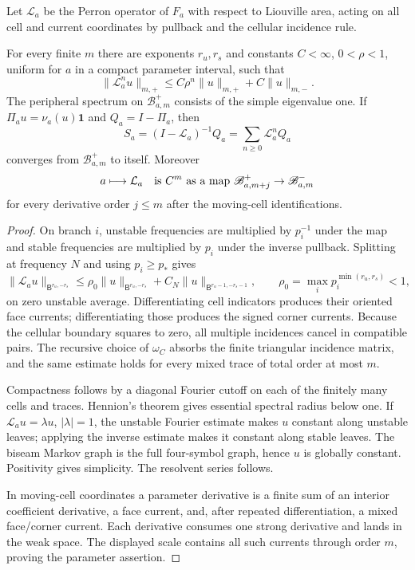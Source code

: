 Let $\mathcal L_a$ be the Perron operator of $F_a$ with respect to Liouville
area, acting on all cell and current coordinates by pullback and the cellular
incidence rule.

\begin{theorem}
\label{thm:r7-a1-anisotropic}
For every finite $m$ there are exponents $r_u,r_s$ and constants
$C<\infty$, $0<\rho<1$, uniform for $a$ in a compact parameter interval, such
that
\[
 \|\mathcal L_a^nu\|_{m,+}
 \le C\rho^n\|u\|_{m,+}+C\|u\|_{m,-}.
\]
The peripheral spectrum on $\mathscr B_{a,m}^+$ consists of the simple
eigenvalue one.  If $\Pi_a u=\nu_a(u)\mathbf1$ and $Q_a=I-\Pi_a$, then
\[
 S_a=(I-\mathcal L_a)^{-1}Q_a
 =\sum_{n\ge0}\mathcal L_a^nQ_a
\]
converges from $\mathscr B_{a,m}^+$ to itself.  Moreover
\[
 a\longmapsto\mathcal L_a
 \quad\hbox{is }C^m\hbox{ as a map }
 \mathscr B_{a,m+j}^+\to\mathscr B_{a,m}^-
\]
for every derivative order $j\le m$ after the moving-cell identifications.
\end{theorem}

\begin{proof}
On branch $i$, unstable frequencies are multiplied by $p_i^{-1}$ under the
map and stable frequencies are multiplied by $p_i$ under the inverse
pullback.  Splitting at frequency $N$ and using $p_i\ge p_*$ gives
\[
 \|\mathcal L_a u\|_{\mathsf B^{r_u,-r_s}}
 \le \rho_0\|u\|_{\mathsf B^{r_u,-r_s}}
 +C_N\|u\|_{\mathsf B^{r_u-1,-r_s-1}},
 \qquad
 \rho_0=\max_i p_i^{\min(r_u,r_s)}<1,
\]
on zero unstable average.  Differentiating cell indicators produces their
oriented face currents; differentiating those produces the signed corner
currents.  Because the cellular boundary squares to zero, all multiple
incidences cancel in compatible pairs.  The recursive choice of $\omega_C$
absorbs the finite triangular incidence matrix, and the same estimate holds
for every mixed trace of total order at most $m$.

Compactness follows by a diagonal Fourier cutoff on each of the finitely many
cells and traces.  Hennion's theorem gives essential spectral radius below
one.  If $\mathcal L_au=\lambda u$, $|\lambda|=1$, the unstable Fourier
estimate makes $u$ constant along unstable leaves; applying the inverse
estimate makes it constant along stable leaves.  The biseam Markov graph is
the full four-symbol graph, hence $u$ is globally constant.  Positivity gives
simplicity.  The resolvent series follows.

In moving-cell coordinates a parameter derivative is a finite sum of an
interior coefficient derivative, a face current, and, after repeated
differentiation, a mixed face/corner current.  Each derivative consumes one
strong derivative and lands in the weak space.  The displayed scale contains
all such currents through order $m$, proving the parameter assertion.
\end{proof}

